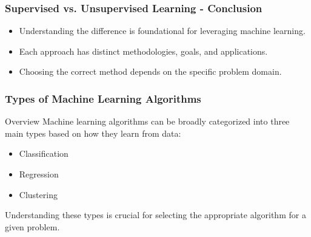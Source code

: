 \documentclass[aspectratio=169]{beamer}
\begin{document}
\begin{frame}[fragile]
  \frametitle{Supervised vs. Unsupervised Learning - Conclusion}
  \begin{itemize}
    \item Understanding the difference is foundational for leveraging machine learning.
    \item Each approach has distinct methodologies, goals, and applications.
    \item Choosing the correct method depends on the specific problem domain.
  \end{itemize}
\end{frame}

\begin{frame}[fragile]
    \frametitle{Types of Machine Learning Algorithms}
    \begin{block}{Overview}
        Machine learning algorithms can be broadly categorized into three main types based on how they learn from data:
        \begin{itemize}
            \item Classification
            \item Regression
            \item Clustering
        \end{itemize}
        Understanding these types is crucial for selecting the appropriate algorithm for a given problem.
    \end{block}
\end{frame}
\end{document}
